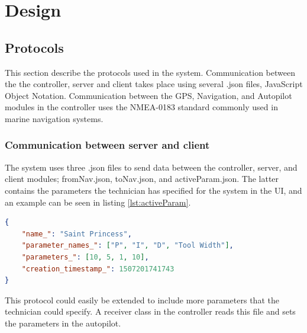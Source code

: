 \newpage
\chapter{Design}

\section{Protocols}

This section describe the protocols used in the system. Communication between the the controller, server and client takes place using several .json files, JavaScript Object Notation. Communication between the GPS, Navigation, and Autopilot modules in the controller uses the NMEA-0183 standard commonly used in marine navigation systems. 

\subsection{Communication between server and client}

The system uses three .json files to send data between the controller, server, and client modules; fromNav.json, toNav.json, and activeParam.json. The latter contains the parameters the technician has specified for the system in the UI, and an example can be seen in listing \ref{lst:activeParam}.

\begin{lstlisting}[caption = {Example of activeParam.JSON}, captionpos=b, label={lst:activeParam}, language=json,firstnumber=1]
{
	"name_": "Saint Princess",
	"parameter_names_": ["P", "I", "D", "Tool Width"],
	"parameters_": [10, 5, 1, 10],
	"creation_timestamp_": 1507201741743
}
\end{lstlisting}

This protocol could easily be extended to include more parameters that the technician could specify. A receiver class in the controller reads this file and sets the parameters in the autopilot.

